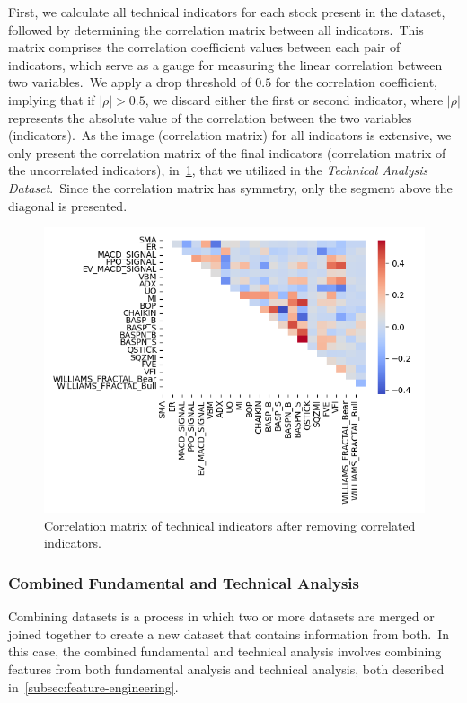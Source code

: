 \documentclass[../xlapes02]{subfiles}
\begin{document}
    First, we calculate all technical indicators for each stock present in the dataset, followed by determining the correlation matrix between all indicators.\ This matrix comprises the correlation coefficient values between each pair of indicators, which serve as a gauge for measuring the linear correlation between two variables.\ We apply a drop threshold of $0.5$ for the correlation coefficient, implying that if $|\rho| > 0.5$, we discard either the first or second indicator, where $|\rho|$ represents the absolute value of the correlation between the two variables (indicators).\ As the image (correlation matrix) for all indicators is extensive, we only present the correlation matrix of the final indicators (correlation matrix of the uncorrelated indicators), in~\cref{fig:ta_correlation_matrix_uncorrelated_indicators}, that we utilized in the \emph{Technical Analysis Dataset}.\ Since the correlation matrix has symmetry, only the segment above the diagonal is presented.
    \begin{figure}[h]
        \includegraphics[width=0.95\linewidth]{image/ta_correlation_matrix_uncorrelated_indicators}
        \centering
        \caption{Correlation matrix of technical indicators after removing correlated indicators.}
        \label{fig:ta_correlation_matrix_uncorrelated_indicators}
    \end{figure}

    \subsubsection{Combined Fundamental and Technical Analysis}\label{subsubsec:combined-fundamental-and-technical-analysis}
    Combining datasets is a process in which two or more datasets are merged or joined together to create a new dataset that contains information from both.\ In this case, the combined fundamental and technical analysis involves combining features from both fundamental analysis and technical analysis, both described in~\cref{subsec:feature-engineering}.
\end{document}
